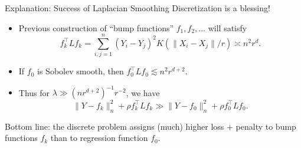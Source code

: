 \documentclass[xcolor=dvipsnames]{beamer}
\newcommand{\blue}[1]{\textcolor{blue}{#1}}
\begin{document}
\begin{frame}{Explanation: Success of Laplacian Smoothing}
\alert{Discretization} is a blessing!  
\begin{itemize}
	\item Previous construction of ``bump functions'' $f_1,f_2,\ldots$ will satisfy
	\begin{equation*}
	f_k^{\top} L f_k = \sum_{i,j = 1}^{n} (Y_i - Y_j)^2 K(\|X_i - X_j\|/r) \asymp n^2r^{d}.
	\end{equation*}
	\item If $f_0$ is Sobolev smooth, then $f_0^{\top} L f_0 \lesssim n^2r^{d + 2}$.
	\item Thus for $\lambda \gg (nr^{d + 2})^{-1} r^{-2}$, we have
	\begin{equation*}
	\|Y - f_k\|_n^2 + \rho f_k^{\top} L f_k \gg \|Y - f_0\|_n^2 + \rho f_0^{\top} L f_0.
	\end{equation*}
\end{itemize}
\alert{Bottom line}: the discrete problem assigns (much) higher loss + penalty to bump functions $f_k$ than to regression function $f_0$. \blue{\smiley}
\end{frame}
\end{document}
